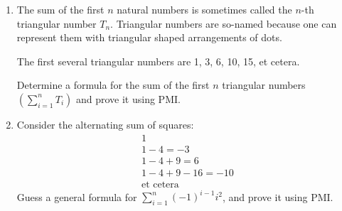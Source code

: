 \begin{enumerate}
\wbvfill

\workbookpagebreak
 
\item The sum of the first $n$ natural numbers is sometimes called
the $n$-th triangular number $T_n$.  Triangular numbers are so-named
because one can represent them with triangular shaped arrangements 
of dots. 

\begin{center}  \end{center}

The first several triangular numbers are 1, 3, 6, 10, 15, et cetera.

Determine a formula for the sum of the first $n$ triangular numbers $\displaystyle \left( \sum_{i=1}^n T_i \right)$ and prove it using PMI.


\wbvfill

\workbookpagebreak

\item Consider the alternating sum of squares:
\begin{gather*}
1 \\
1 - 4 = -3 \\
1 - 4 + 9 = 6 \\
1 - 4 + 9 - 16 = -10 \\
\mbox{et cetera}
\end{gather*}
Guess a general formula for $\sum_{i=1}^n (-1)^{i-1} i^2$, and prove it using PMI.

\end{enumerate}

